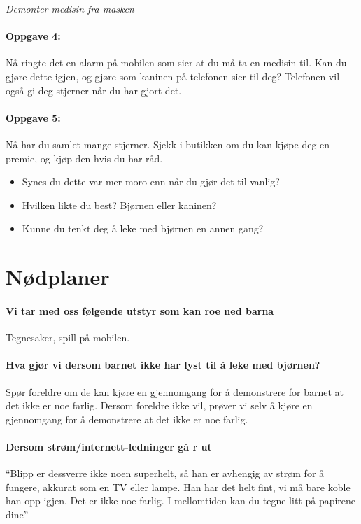 \emph{Demonter medisin fra masken}

\paragraph{Oppgave 4:}
N\r{a}  ringte det en alarm p\r{a}  mobilen som sier at du m\r{a}  ta en medisin til. Kan du gj\o re dette igjen, og gj\o re som kaninen p\r{a}  telefonen sier til deg? Telefonen vil ogs\r{a}  gi deg stjerner n\r{a}r du har gjort det. 

\paragraph{Oppgave 5:}
N\r{a}  har du samlet mange stjerner. Sjekk i butikken om du kan kj\o pe deg en premie, og kj\o p den hvis du har r\r{a}d.  


\begin{itemize}
  \item Synes du dette var mer moro enn n\r{a}r du gj\o r det til vanlig?
  \item Hvilken likte du best? Bj\o rnen eller kaninen?
  \item Kunne du tenkt deg \r{a}  leke med bj\o rnen en annen gang? 
\end{itemize}

\section{N\o dplaner}
\paragraph{Vi tar med oss f\o lgende utstyr som kan roe ned barna}
Tegnesaker, spill p\r{a}  mobilen. 

\paragraph{Hva gj\o r vi dersom barnet ikke har lyst til \r{a}  leke med bj\o rnen?}
Sp\o r foreldre om de kan kj\o re en gjennomgang for \r{a}  demonstrere for barnet at det ikke er noe farlig. 
Dersom foreldre ikke vil, pr\o ver vi selv \r{a}  kj\o re en gjennomgang for \r{a}  demonstrere at det ikke er noe farlig. 
 
\paragraph{Dersom str\o m/internett-ledninger g\r{a} r ut}
``Blipp er dessverre ikke noen superhelt, s\r{a}  han er avhengig av str\o m for \r{a}  fungere, akkurat som en TV eller lampe. Han har det helt fint, vi m\r{a}  bare koble han opp igjen. Det er ikke noe farlig. I mellomtiden kan du tegne litt p\r{a}  papirene dine''

